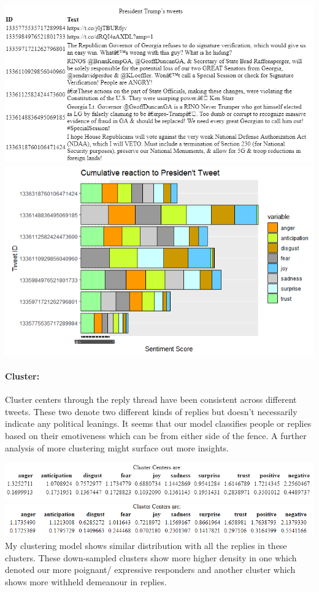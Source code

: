 \documentclass[
]{article}
\begin{document}
\includegraphics{final report resources/tweets.png}
\includegraphics{final report resources/sentiments.png}

\hypertarget{cluster}{%
\paragraph{Cluster:}\label{cluster}}

Cluster centers through the reply thread have been consistent across
different tweets. These two denote two different kinds of replies but
doesn't necessarily indicate any political leanings. It seems that our
model classifies people or replies based on their emotiveness which can
be from either side of the fence. A further analysis of more clustering
might surface out more insights.

\includegraphics{final report resources/cluster center.png}
\includegraphics{final report resources/cluster center 2.png} My
clustering model shows similar distribution with all the replies in
these clusters. These down-sampled clusters show more higher density in
one which denoted our more poignant/ expressive responders and another
cluster which shows more withheld demeanour in replies.
\end{document}
